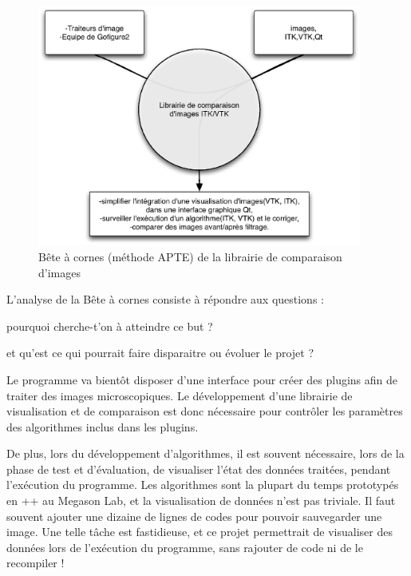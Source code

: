 \begin{figure}[h]
\begin{center}
\leavevmode
\includegraphics[width=0.95\textwidth]{pictures/CompareBAC}
\end{center}
\caption{Bête à cornes (méthode {APTE\textregistered}) de la librairie de comparaison d'images}
\label{fig:BACCompare}
\end{figure}

L'analyse de la Bête à cornes consiste à répondre aux questions :
\begin{inparaenum}[(i)] 
  \item pourquoi cherche-t'on à atteindre ce but ?
  \item et qu'est ce qui pourrait faire disparaitre ou évoluer le projet ?
\end{inparaenum}

Le programme {\gofigure} va bientôt disposer d'une interface pour créer des plugins afin de traiter des images microscopiques.
Le développement d'une librairie de visualisation et de comparaison est donc nécessaire
pour contrôler les paramètres des algorithmes inclus dans les plugins.

De plus, lors du développement d'algorithmes,
il est souvent nécessaire, lors de la phase de test et d'évaluation,
de visualiser l'état des données traitées, pendant l'exécution du programme.
Les algorithmes sont la plupart du temps prototypés en \C++ au Megason Lab, et la visualisation de données n'est pas triviale.
Il faut souvent ajouter une dizaine de lignes de codes pour pouvoir sauvegarder une image.
Une telle tâche est fastidieuse, et ce projet permettrait de visualiser
des données lors de l'exécution du programme, sans rajouter de code ni de le recompiler !\\

